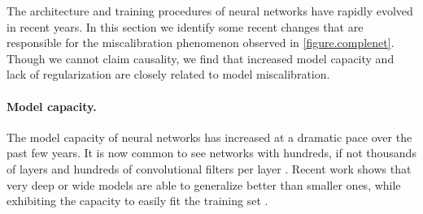\setlength{\abovedisplayskip}{4pt}
\setlength{\belowdisplayskip}{4pt}
\setlength{\textfloatsep}{4pt}

The architecture and training procedures of neural networks have rapidly evolved in recent years. In this section we identify some recent changes that are responsible for the miscalibration phenomenon observed in \autoref{figure.complenet}.
Though we cannot claim causality, we find that increased model capacity and lack of regularization are closely related to model miscalibration.



\paragraph{Model capacity.}
The model capacity of neural networks has increased at a dramatic pace over the past few years. It is now common to see networks with hundreds, if not thousands of layers \cite{he2015deep,huang2016deep} and hundreds of convolutional filters per layer \cite{zagoruyko2016wide}. Recent work shows that very deep or wide models are able to generalize better than smaller ones, while exhibiting the capacity to easily fit the training set \cite{zhang2016understanding}.

